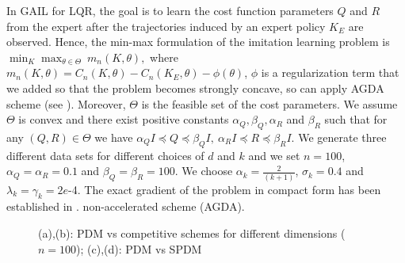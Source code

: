 \documentclass[letterpaper,11 pt]{article}
\newcommand{\afj}[1]{{\color{black}#1}}
\begin{document}
In GAIL for LQR, the goal is to learn the cost function parameters $Q$ and $R$ from the expert after the trajectories induced by an expert policy $K_E$ are observed. Hence, the min-max formulation of the imitation learning problem is $\min_K\max_{\theta\in \Theta}\ m_n(K,\theta),$
where $m_n(K,\theta)=C_n(K,\theta)-C_n(K_E,\theta)-\phi(\theta)$, $\phi$ is a regularization term that we added so that the problem becomes strongly concave, so can apply AGDA scheme (see \cite{yang2020global}). Moreover, $\Theta$ is the feasible set of the cost parameters.  We assume $\Theta$ is convex and there exist positive constants $\alpha_Q,\beta_Q,\alpha_R$ and $\beta_R$ such that for any $(Q,R)\in \Theta$ we have
$\alpha_QI\preceq Q\preceq \beta_QI, \ \alpha_RI\preceq R\preceq\beta_RI.$
We generate three different data sets for different choices of $d$ and $k$ and we set $n=100$, $\alpha_Q=\alpha_R=0.1$ and $\beta_Q=\beta_R=100$. We choose $\alpha_k=\tfrac{2}{(k+1)}$, $\sigma_k=0.4$ and $\lambda_k=\gamma_k=2e$-4. The exact gradient of the problem in compact form has been established in \cite{fazel2018global}. 
non-accelerated scheme (AGDA). 
\begin{figure}[htb]
    \centering
   \caption{ \afj{(a),(b): PDM vs competitive schemes for different dimensions ($n=100$); (c),(d): PDM vs SPDM }}
    \label{figcomp}\vspace{-3mm}
\end{figure}
\end{document}

